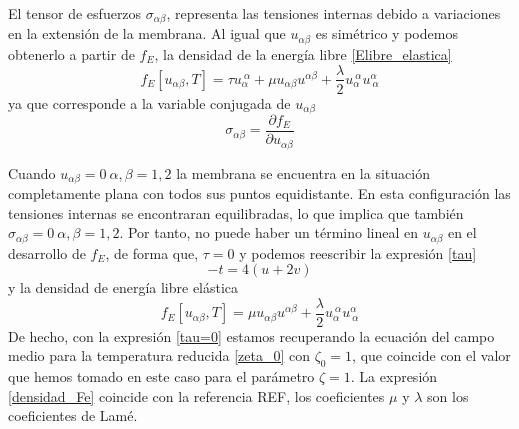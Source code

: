 El tensor de esfuerzos $\sigma_{\alpha\beta}$, representa las tensiones
internas debido a variaciones en la extensión de la membrana. Al igual que
$u_{\alpha\beta}$ es simétrico y podemos obtenerlo a partir de $f_E$, la densidad de
la energía libre \eqref{Elibre_elastica}
\begin{equation}
f_E[u_{\alpha\beta},T]=\tau u_{\alpha}^{\ \alpha}+
\mu u_{\alpha\beta}u^{\alpha\beta} +
\frac{\lambda}{2}u_{\alpha}^{\ \alpha}u^{\alpha}_{\ \alpha}
\end{equation}
ya que corresponde a la variable conjugada de $u_{\alpha\beta}$
\begin{equation}\label{tensor_esfuerzos}
\sigma_{\alpha\beta}=\frac{\partial f_E}{ \partial u_{\alpha\beta}}
\end{equation}

Cuando $u_{\alpha\beta}=0 \ \alpha,\beta=1,2$ la membrana se encuentra en
la situación completamente plana con todos sus puntos equidistante. En esta
configuración las tensiones internas se encontraran equilibradas, lo que
implica que también $\sigma_{\alpha\beta}=0 \ \alpha,\beta=1,2$. Por tanto, no puede haber
un término lineal en $u_{\alpha\beta}$ en el desarrollo de $f_E$, de forma que,
 $\tau=0$ y podemos reescribir la expresión \eqref{tau}
\begin{equation}\label{tau=0}
-t=4(u+2v)
\end{equation}   
y la densidad de energía libre elástica
\begin{equation}\label{densidad_Fe}
f_E[u_{\alpha\beta},T]=
\mu u_{\alpha\beta}u^{\alpha\beta} +
\frac{\lambda}{2}u_{\alpha}^{\ \alpha}u^{\alpha}_{\ \alpha}
\end{equation} 
De hecho, con la expresión \eqref{tau=0} estamos recuperando la ecuación del
campo medio para la temperatura reducida \eqref{zeta_0} con $\zeta_0=1$, que
coincide con el valor que hemos tomado en este caso para el parámetro $\zeta=1$.
La expresión \eqref{densidad_Fe} coincide con la referencia REF, los
coeficientes $\mu$ y $\lambda$ son los coeficientes de Lamé. 

